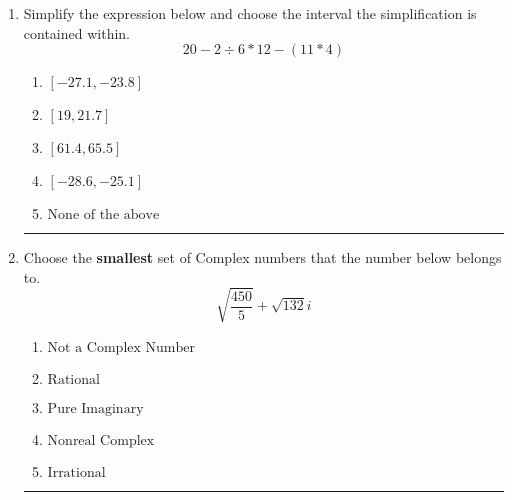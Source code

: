 \documentclass[14pt]{extbook}
\newcommand{\litem}[1]{\item#1\hspace*{-1cm}\rule{\textwidth}{0.4pt}}
\begin{document}
\begin{enumerate}
{\begin{enumerate}[label=\Alph*.]
\end{enumerate} }
\litem{
Simplify the expression below and choose the interval the simplification is contained within.\[ 20 - 2 \div 6 * 12 - (11 * 4) \]\begin{enumerate}[label=\Alph*.]
\item \( [-27.1, -23.8] \)
\item \( [19, 21.7] \)
\item \( [61.4, 65.5] \)
\item \( [-28.6, -25.1] \)
\item \( \text{None of the above} \)

\end{enumerate} }
\litem{
Choose the \textbf{smallest} set of Complex numbers that the number below belongs to.\[ \sqrt{\frac{450}{5}}+\sqrt{132} i \]\begin{enumerate}[label=\Alph*.]
\item \( \text{Not a Complex Number} \)
\item \( \text{Rational} \)
\item \( \text{Pure Imaginary} \)
\item \( \text{Nonreal Complex} \)
\item \( \text{Irrational} \)

\end{enumerate} }
\end{enumerate}
\end{document}
